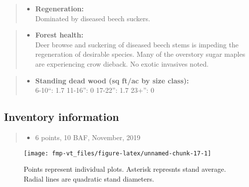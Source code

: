 \documentclass[]{tufte-handout}
\providecommand{\tightlist}{%
  \setlength{\itemsep}{0pt}\setlength{\parskip}{0pt}}
\begin{document}
\begin{quote}
\begin{itemize}
\tightlist
\item
  \textbf{Regeneration:}\\
  \vspace{2pt} Dominated by diseased beech suckers.
\end{itemize}
\end{quote}

\begin{quote}
\begin{itemize}
\tightlist
\item
  \textbf{Forest health:}\\
  \vspace{2pt} Deer browse and suckering of diseased beech stems is
  impeding the regeneration of desirable species. Many of the overstory
  sugar maples are experiencing crow dieback. No exotic invasives noted.
\end{itemize}
\end{quote}

\begin{quote}
\begin{itemize}
\tightlist
\item
  \textbf{Standing dead wood (sq ft/ac by size class):}\\
  \vspace{2pt} \indent \small 6-10``: 1.7 \textbar{} 11-16'': 0
  \textbar{} 17-22'': 1.7 \textbar{} 23+'': 0
\end{itemize}
\end{quote}

\subsection{Inventory information}\label{inventory-information-2}

\begin{quote}
\begin{itemize}
\tightlist
\item
  6 points, 10 BAF, November, 2019
\end{itemize}
\end{quote}

\begin{figure}
\texttt{[image: fmp-vt\_files/figure-latex/unnamed-chunk-17-1]} \caption[Points represent individual plots]{Points represent individual plots. Asterisk represnts stand average. Radial lines are quadratic stand diameters.}\label{fig:unnamed-chunk-17}
\end{figure}
\end{document}
